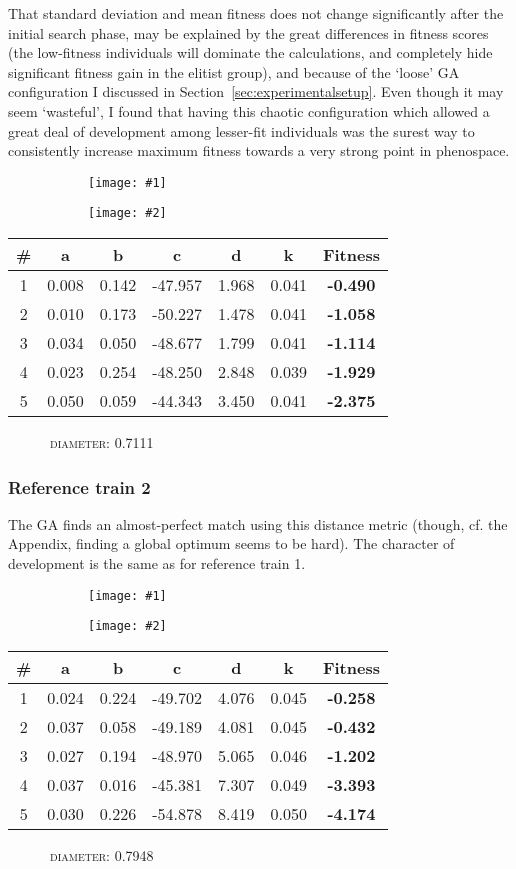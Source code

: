 \documentclass[a4paper,9pt]{article}
\newcommand{\tightit}{\vspace{-5pt}}
\newcommand{\casedata}[4]{
    \begin{figure}[!h]
        \centering
        \begin{subfigure}{.5\textwidth}
          \centering
          \texttt{[image: \#1]}
        \end{subfigure}%
        \begin{subfigure}{.5\textwidth}
          \centering
          \texttt{[image: \#2]}
        \end{subfigure}
    \end{figure}

    { \scriptsize
    \begin{tabular}{c|c|c|c|c|c||c}
    \textbf{\#} & \textbf{a} & \textbf{b} & \textbf{c} & 
      \textbf{d} & \textbf{k} & \textbf{Fitness} \\ \hline
      #3
    \end{tabular} 
    \textsc{~~~~~~diameter:} #4
    \ \\
    }
}
\begin{document}
That standard deviation and mean fitness does not change significantly after
the initial search phase, may be explained by the great differences in fitness
scores (the low-fitness individuals will dominate the calculations, and
completely hide significant fitness gain in the elitist group), and because of
the `loose' GA configuration I discussed in
Section~\ref{sec:experimentalsetup}. Even though it may seem `wasteful', I
found that having this chaotic configuration which allowed a great deal of
development among lesser-fit individuals was the surest way to consistently
increase maximum fitness towards a very strong point in phenospace.


\casedata{../data/izzy-train1.dat_spike-time_2.png}
         {../data/izzy-train1.dat_spike-time_2.dev.png}
         {
1 & 0.008 & 0.142 & -47.957 & 1.968 & 0.041 &\textbf{-0.490} \\ \hline
2 & 0.010 & 0.173 & -50.227 & 1.478 & 0.041 &\textbf{-1.058} \\ \hline
3 & 0.034 & 0.050 & -48.677 & 1.799 & 0.041 &\textbf{-1.114} \\ \hline
4 & 0.023 & 0.254 & -48.250 & 2.848 & 0.039 &\textbf{-1.929} \\ \hline
5 & 0.050 & 0.059 & -44.343 & 3.450 & 0.041 &\textbf{-2.375} \\ \hline
        }
        {0.7111}



\subsubsection{Reference train 2}
\tightit
The GA finds an almost-perfect match using this distance metric (though, cf.
the Appendix, finding a global optimum seems to be hard). The
character of development is the same as for reference train 1. 

\casedata{../data/izzy-train2.dat_spike-time_1.png}
         {../data/izzy-train2.dat_spike-time_1.dev.png}
         {
1 & 0.024 & 0.224 & -49.702 & 4.076 & 0.045 &\textbf{-0.258} \\ \hline
2 & 0.037 & 0.058 & -49.189 & 4.081 & 0.045 &\textbf{-0.432} \\ \hline
3 & 0.027 & 0.194 & -48.970 & 5.065 & 0.046 &\textbf{-1.202} \\ \hline
4 & 0.037 & 0.016 & -45.381 & 7.307 & 0.049 &\textbf{-3.393} \\ \hline
5 & 0.030 & 0.226 & -54.878 & 8.419 & 0.050 &\textbf{-4.174} \\ \hline
         }
         {0.7948}
\end{document}
